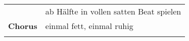 \begin{tabular}{p{1.6cm}l}
	                & ab Hälfte in vollen satten Beat spielen                       \\ %
	\textbf{Chorus} & einmal fett, einmal ruhig                                     \\ %
	                &                                                               \\
\end{tabular}

